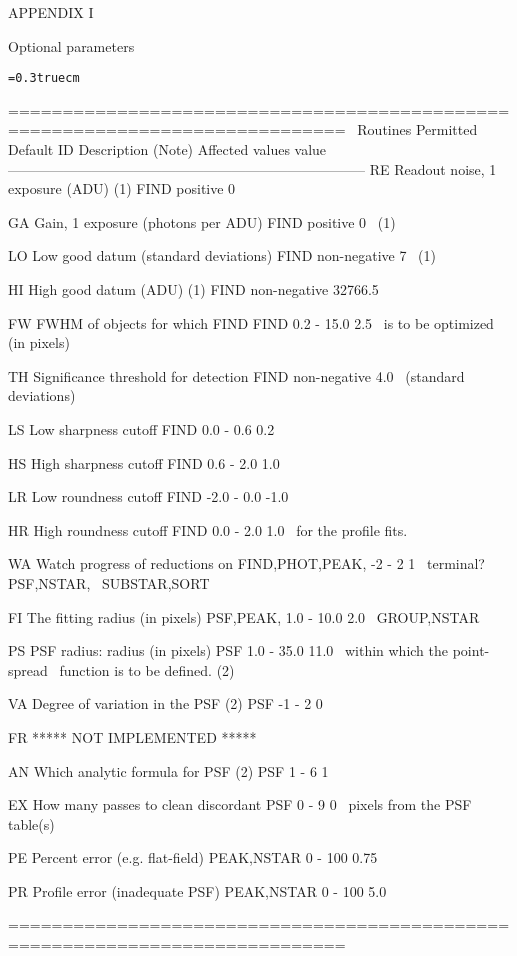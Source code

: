 \vfill
\eject
\centerline{APPENDIX I}
\bigskip
\centerline{Optional parameters}
\bigskip
{\noindent\obeylines\obeyspaces\frenchspacing\tt\baselineskip=0.3truecm

=============================================================================
\                                          Routines      Permitted     Default
ID        Description (Note)              Affected        values       value 
-----------------------------------------------------------------------------
RE  Readout noise, 1 exposure (ADU) (1)     FIND         positive        0

GA  Gain, 1 exposure (photons per ADU)      FIND         positive        0
\    (1)

LO  Low good datum (standard deviations)    FIND       non-negative      7
\    (1)

HI  High good datum (ADU) (1)               FIND       non-negative   32766.5

FW  FWHM of objects for which FIND          FIND        0.2 - 15.0      2.5 
\    is to be optimized (in pixels)                                      

TH  Significance threshold for detection    FIND       non-negative     4.0
\    (standard deviations)

LS  Low sharpness cutoff                    FIND         0.0 - 0.6      0.2  

HS  High sharpness cutoff                   FIND         0.6 - 2.0      1.0  

LR  Low roundness cutoff                    FIND        -2.0 - 0.0     -1.0  

HR  High roundness cutoff                   FIND         0.0 - 2.0      1.0  
\    for the profile fits.   

WA  Watch progress of reductions on    FIND,PHOT,PEAK,    -2 - 2         1
\    terminal?                            PSF,NSTAR,
\                                        SUBSTAR,SORT

FI  The fitting radius (in pixels)        PSF,PEAK,      1.0 - 10.0     2.0 
\                                         GROUP,NSTAR
  
PS  PSF radius: radius (in pixels)          PSF          1.0 - 35.0    11.0 
\    within which the point-spread      
\    function is to be defined. (2)                                       

VA  Degree of variation in the PSF (2)      PSF           -1 - 2         0

FR                         ***** NOT IMPLEMENTED *****

AN  Which analytic formula for PSF (2)      PSF            1 - 6         1

EX  How many passes to clean discordant     PSF            0 - 9         0
\    pixels from the PSF table(s)

PE  Percent error (e.g. flat-field)      PEAK,NSTAR       0 - 100       0.75

PR  Profile error (inadequate PSF)       PEAK,NSTAR       0 - 100       5.0

=============================================================================

}

